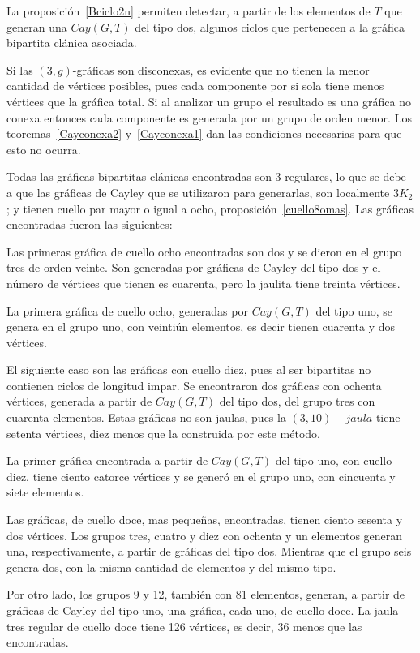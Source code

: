 \documentclass[12pt]{book}
\theoremstyle{definition}
\begin{document}
La proposición~\ref{Bciclo2n} permiten detectar, a partir de los
elementos de $T$ que generan una $Cay(G,T)$ del tipo dos, algunos
ciclos que pertenecen a la gráfica bipartita clánica asociada.


Si las $(3,g)$-gráficas son disconexas, es evidente que no tienen la
menor cantidad de vértices posibles, pues cada componente por si sola
tiene menos vértices que la gráfica total. Si al analizar un grupo el
resultado es una gráfica no conexa entonces cada componente es
generada por un grupo de orden menor. Los teoremas~\ref{Cayconexa2}
y~\ref{Cayconexa1} dan las condiciones necesarias para que esto no
ocurra.


Todas las gráficas bipartitas clánicas encontradas son $3$-regulares,
lo que se debe a que las gráficas de Cayley que se utilizaron para
generarlas, son localmente $3K_2$; y tienen cuello par mayor o igual a
ocho, proposición~\ref{cuello8omas}.  Las gráficas encontradas fueron
las siguientes:

Las primeras gráfica de cuello ocho encontradas son dos y se dieron en
el grupo tres de orden veinte. Son generadas por gráficas de Cayley
del tipo dos y el n\'umero de vértices que tienen es cuarenta, pero la
jaulita tiene treinta vértices.

La primera gráfica de cuello ocho, generadas por $Cay(G,T)$ del tipo
uno, se genera en el grupo uno, con veintiún elementos, es decir
tienen cuarenta y dos vértices.

El siguiente caso son las gráficas con cuello diez, pues al ser
bipartitas no contienen ciclos de longitud impar. Se encontraron dos
gráficas con ochenta vértices, generada a partir de $Cay(G,T)$ del
tipo dos, del grupo tres con cuarenta elementos. Estas gráficas no son
jaulas, pues la $(3,10)-jaula$ tiene setenta vértices, diez menos que
la construida por este método.
  
La primer gráfica encontrada a partir de $Cay(G,T)$ del tipo uno, con
cuello diez, tiene ciento catorce vértices y se generó en el grupo
uno, con cincuenta y siete elementos.


Las gráficas, de cuello doce, mas pequeñas, encontradas, tienen ciento
sesenta y dos vértices. Los grupos tres, cuatro y diez con ochenta y
un elementos generan una, respectivamente, a partir de gráficas del
tipo dos. Mientras que el grupo seis genera dos, con la misma cantidad
de elementos y del mismo tipo.

Por otro lado, los grupos 9 y 12, también con 81
elementos, generan, a partir de gráficas de Cayley del tipo uno, una
gráfica, cada uno, de cuello doce. La jaula tres regular de cuello
doce tiene 126 vértices, es decir, 36 menos
que las encontradas.
\end{document}
